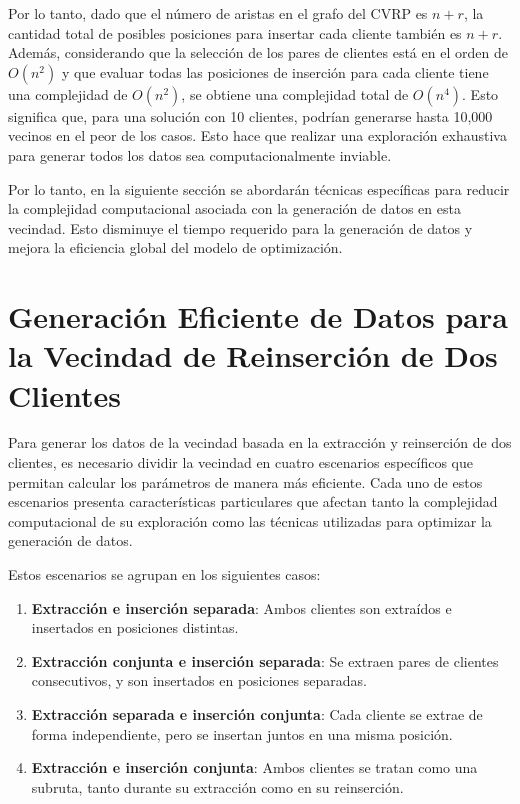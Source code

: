 \documentclass{article}
\begin{document}
Por lo tanto, dado que el número de aristas en el grafo del CVRP es $n+r$, la cantidad total de posibles posiciones para insertar cada cliente también es $n+r$. Además, considerando que la selección de los pares de clientes está en el orden de $O(n^2)$ y que evaluar todas las posiciones de inserción para cada cliente tiene una complejidad de $O(n^2)$, se obtiene una complejidad total de $O(n^4)$. Esto significa que, para una solución con 10 clientes, podrían generarse hasta 10,000 vecinos en el peor de los casos. Esto hace que realizar una exploración exhaustiva para generar todos los datos sea computacionalmente inviable.

Por lo tanto, en la siguiente sección se abordarán técnicas específicas para reducir la complejidad computacional asociada con la generación de datos en esta vecindad. Esto disminuye el tiempo requerido para la generación de datos y mejora la eficiencia global del modelo de optimización.


\section{Generación Eficiente de Datos para la Vecindad de Reinserción de Dos Clientes}  

Para generar los datos de la vecindad basada en la extracción y reinserción de dos clientes, es necesario dividir la vecindad en cuatro escenarios específicos que permitan calcular los parámetros de manera más eficiente. Cada uno de estos escenarios presenta características particulares que afectan tanto la complejidad computacional de su exploración como las técnicas utilizadas para optimizar la generación de datos.  

Estos escenarios se agrupan en los siguientes casos:  
\begin{enumerate}
    \item \textbf{Extracción e inserción separada}: Ambos clientes son extraídos e insertados en posiciones distintas.  
    \item \textbf{Extracción conjunta e inserción separada}: Se extraen pares de clientes consecutivos, y son insertados en posiciones separadas.  
    \item \textbf{Extracción separada e inserción conjunta}: Cada cliente se extrae de forma independiente, pero se insertan juntos en una misma posición.  
    \item \textbf{Extracción e inserción conjunta}: Ambos clientes se tratan como una subruta, tanto durante su extracción como en su reinserción.  
\end{enumerate}
\end{document}
